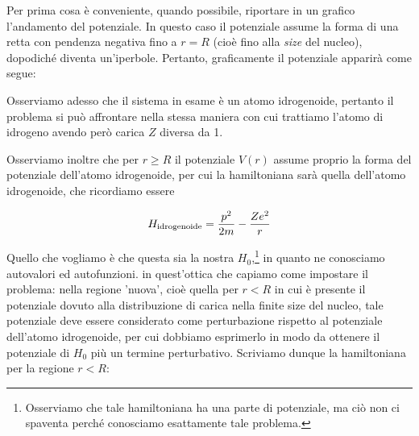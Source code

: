 \begin{soluzione}
   Per prima cosa è conveniente, quando possibile, riportare in un grafico l'andamento del potenziale. In questo caso il potenziale assume la forma di una retta con pendenza negativa fino a $r=R$ (cioè fino alla \textit{size} del nucleo), dopodiché diventa un'iperbole. Pertanto, graficamente il potenziale apparirà come segue:

   \begin{figure}[H]
      \centering
   \end{figure}

   Osserviamo adesso che il sistema in esame è un atomo idrogenoide, pertanto il problema si può affrontare nella stessa maniera con cui trattiamo l'atomo di idrogeno avendo però carica $Z$ diversa da 1.
   
   Osserviamo inoltre che per $r \geq R$ il potenziale $V(r)$ assume proprio la forma del potenziale dell'atomo idrogenoide, per cui la hamiltoniana sarà quella dell'atomo idrogenoide, che ricordiamo essere

   \begin{equation*}
      H_{\rm idrogenoide}
      =\frac{p^2}{2m} - \frac{Ze^2}{r}
   \end{equation*}

   Quello che vogliamo è che questa sia la nostra $H_0$,\footnote{Osserviamo che tale hamiltoniana ha una parte di potenziale, ma ciò non ci spaventa perché conosciamo esattamente tale problema.} in quanto ne conosciamo autovalori ed autofunzioni. \E in quest'ottica che capiamo come impostare il problema: nella regione 'nuova', cioè quella per $r<R$ in cui è presente il potenziale dovuto alla distribuzione di carica nella finite size del nucleo, tale potenziale deve essere considerato come perturbazione rispetto al potenziale dell'atomo idrogenoide, per cui dobbiamo esprimerlo in modo da ottenere il potenziale di $H_0$ più un termine perturbativo. Scriviamo dunque la hamiltoniana per la regione $r<R$:
   

\end{soluzione}
